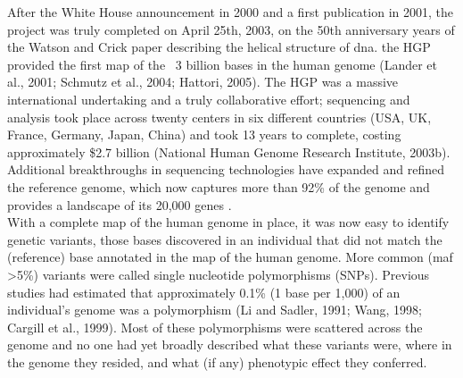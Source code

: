 After the White House announcement in 2000 and a first publication in 2001, the 
project was truly completed on April 25th, 2003, on the 50th anniversary years of the Watson and Crick paper describing the helical structure of \gls{dna}.
the HGP provided the first map of the ~3 billion bases in the human genome (Lander et al., 2001; Schmutz et al., 2004; Hattori, 2005). 
The HGP was a massive international undertaking and a truly collaborative effort; sequencing and analysis took place across twenty centers in six different countries (USA, UK, France, Germany, Japan, China) and took 13 years to complete, costing approximately \$2.7 billion (National Human Genome Research Institute, 2003b).\\ 

Additional breakthroughs in sequencing technologies have expanded and refined the reference genome, which now captures more than 92\% of the genome and provides a landscape of its 20,000 genes \cite{lander2001initial}.\\

With a complete map of the human genome in place, it was now easy to identify genetic variants, those bases discovered in an individual that did not match the (reference) base annotated in the map of the human genome. 
More common (\gls{maf} >5\%) variants were called single nucleotide polymorphisms (SNPs). 
Previous studies had estimated that approximately 0.1\% (1 base per 1,000) of an individual's genome was a polymorphism (Li and Sadler, 1991; Wang, 1998; Cargill et al., 1999). 
Most of these polymorphisms were scattered across the genome and no one had yet broadly described what these variants were, where in the genome they resided, and what (if any) phenotypic effect they conferred.\\

